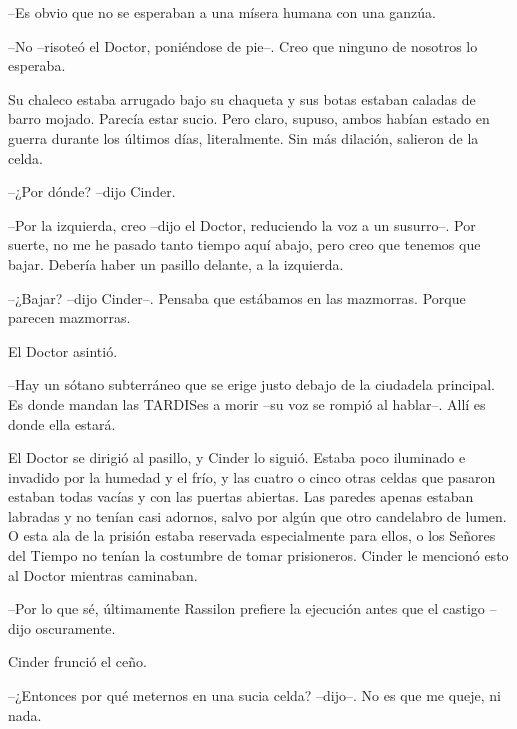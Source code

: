 --Es obvio que no se esperaban a una mísera humana con una ganzúa.



--No --risoteó el Doctor, poniéndose de pie--. Creo que ninguno de nosotros lo esperaba.



Su chaleco estaba arrugado bajo su chaqueta y sus botas estaban caladas de barro mojado. Parecía estar sucio. Pero claro, supuso, ambos habían estado en guerra durante los últimos días, literalmente. Sin más dilación, salieron de la celda.



--¿Por dónde? --dijo Cinder.



--Por la izquierda, creo --dijo el Doctor, reduciendo la voz a un susurro--. Por suerte, no me he pasado tanto tiempo aquí abajo, pero creo que tenemos que bajar. Debería haber un pasillo delante, a la izquierda.



--¿Bajar? --dijo Cinder--. Pensaba que estábamos en las mazmorras. Porque parecen mazmorras.



El Doctor asintió.



--Hay un sótano subterráneo que se erige justo debajo de la ciudadela principal. Es donde mandan las TARDISes a morir --su voz se rompió al hablar--. Allí es donde ella estará.



El Doctor se dirigió al pasillo, y Cinder lo siguió. Estaba poco iluminado e invadido por la humedad y el frío, y las cuatro o cinco otras celdas que pasaron estaban todas vacías y con las puertas abiertas. Las paredes apenas estaban labradas y no tenían casi adornos, salvo por algún que otro candelabro de lumen. O esta ala de la prisión estaba reservada especialmente para ellos, o los Señores del Tiempo no tenían la costumbre de tomar prisioneros. Cinder le mencionó esto al Doctor mientras caminaban.



--Por lo que sé, últimamente Rassilon prefiere la ejecución antes que el castigo --dijo oscuramente.



Cinder frunció el ceño.



--¿Entonces por qué meternos en una sucia celda? --dijo--. No es que me queje, ni nada.




